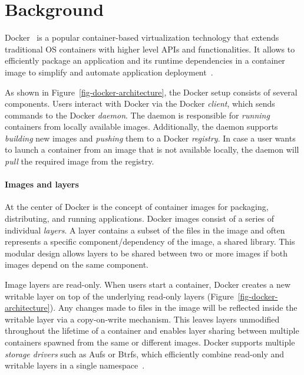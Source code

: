 \section{Background}
\label{sec:background}


Docker~\cite{docker} is a popular container-based virtualization technology
that extends traditional OS containers with higher level APIs and
functionalities.
%
It allows to efficiently package an application and its runtime dependencies
in a container image to simplify and automate application deployment~\cite{slacker}.
%



As shown in Figure~\ref{fig-docker-architecture}, the Docker setup consists of
several components.
%
Users interact with Docker via the Docker \emph{client}, which sends commands
to the Docker \emph{daemon}.
%
The daemon is responsible for \emph{running} containers from locally available
images.
%
Additionally, the daemon supports \emph{building} new images and \emph{pushing}
them to a Docker \emph{registry}.
%
In case a user wants to launch a container from an image that is not available
locally, the daemon will \emph{pull} the required image from the registry.

\paragraph{Images and layers}
%
At the center of Docker is the concept of container images for packaging,
distributing, and running applications.
%
Docker images consist of a series of individual \emph{layers}.
%
A layer contains a subset of the files in the image and often represents a
specific component/dependency of the image, \eg a shared library.
%
This modular design allows layers to be shared between two or more images if
both images depend on the same component.

Image layers are read-only.
%
When users start a container, Docker creates a new
writable layer on top of the underlying read-only layers
(Figure~\ref{fig-docker-architecture}).
%
Any changes made to files in the image will be reflected inside the writable
layer via a copy-on-write mechanism.
%
This leaves layers unmodified throughout the lifetime of a container and
enables layer sharing between multiple containers spawned from the same or
different images.
%
Docker supports multiple \emph{storage drivers} such as Aufs or Btrfs, which
efficiently combine read-only and writable layers in a single
namespace~\cite{docker-driver-eval}.
%

